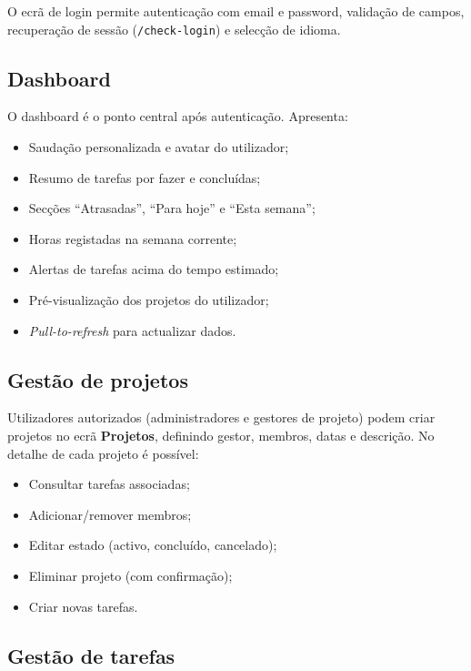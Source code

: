 \documentclass[12pt,a4paper]{article}
\begin{document}
O ecrã de login permite autenticação com email e password, validação de campos, recuperação de sessão (\texttt{/check-login}) e selecção de idioma.

\subsection{Dashboard}

O dashboard é o ponto central após autenticação. Apresenta:

\begin{itemize}[leftmargin=*]
    \item Saudação personalizada e avatar do utilizador;
    \item Resumo de tarefas por fazer e concluídas;
    \item Secções ``Atrasadas'', ``Para hoje'' e ``Esta semana'';
    \item Horas registadas na semana corrente;
    \item Alertas de tarefas acima do tempo estimado;
    \item Pré-visualização dos projetos do utilizador;
    \item \textit{Pull-to-refresh} para actualizar dados.
\end{itemize}

\subsection{Gestão de projetos}

Utilizadores autorizados (administradores e gestores de projeto) podem criar projetos no ecrã \textbf{Projetos}, definindo gestor, membros, datas e descrição. No detalhe de cada projeto é possível:

\begin{itemize}[leftmargin=*]
    \item Consultar tarefas associadas;
    \item Adicionar/remover membros;
    \item Editar estado (activo, concluído, cancelado);
    \item Eliminar projeto (com confirmação);
    \item Criar novas tarefas.
\end{itemize}

\subsection{Gestão de tarefas}
\end{document}
